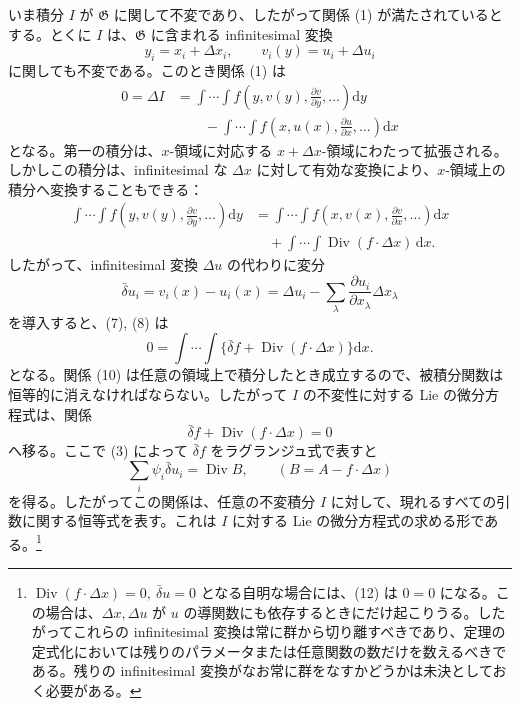 \documentclass[11pt]{article}
\newcommand{\D}{\Delta}
\providecommand{\dd}{\mathrm d}
\providecommand{\Div}{\operatorname{Div}}
\providecommand{\G}{\mathfrak G}
\providecommand{\bd}{\bar{\delta}}
\providecommand{\p}{\partial}
\begin{document}
いま積分 \(I\) が \(\G\) に関して不変であり、したがって関係 (1) が満たされているとする。とくに \(I\) は、\(\G\) に含まれる infinitesimal 変換
\[
y_i=x_i+\D x_i,\qquad v_i(y)=u_i+\D u_i
\]
に関しても不変である。このとき関係 (1) は
\begin{equation}
\begin{aligned}
0=\D I
&=\int\!\cdots\!\int f\!\left(y,v(y),\frac{\p v}{\p y},\ldots\right)\dd y\\
&\qquad-\int\!\cdots\!\int f\!\left(x,u(x),\frac{\p u}{\p x},\ldots\right)\dd x
\end{aligned}
\tag{7}
\end{equation}
となる。第一の積分は、\(x\)-領域に対応する \(x+\D x\)-領域にわたって拡張される。しかしこの積分は、infinitesimal な \(\D x\) に対して有効な変換により、\(x\)-領域上の積分へ変換することもできる：
\begin{equation}
\begin{aligned}
\int\!\cdots\!\int f\!\left(y,v(y),\frac{\p v}{\p y},\ldots\right)\dd y
&=\int\!\cdots\!\int f\!\left(x,v(x),\frac{\p v}{\p x},\ldots\right)\dd x\\
&\quad+\int\!\cdots\!\int \Div(f\cdot \D x)\,\dd x.
\end{aligned}
\tag{8}
\end{equation}
したがって、infinitesimal 変換 \(\D u\) の代わりに変分
\begin{equation}
\bd u_i=v_i(x)-u_i(x)=\D u_i-\sum_\lambda\frac{\p u_i}{\p x_\lambda}\D x_\lambda
\tag{9}
\end{equation}
を導入すると、(7), (8) は
\begin{equation}
0=\int\!\cdots\!\int\{\bd f+\Div(f\cdot\D x)\}\dd x.
\tag{10}
\end{equation}
となる。関係 (10) は任意の領域上で積分したとき成立するので、被積分関数は恒等的に消えなければならない。したがって \(I\) の不変性に対する Lie の微分方程式は、関係
\begin{equation}
\bd f+\Div(f\cdot\D x)=0
\tag{11}
\end{equation}
へ移る。ここで (3) によって \(\bd f\) をラグランジュ式で表すと
\begin{equation}
\sum_i\psi_i\bd u_i=\Div B,\qquad (B=A-f\cdot\D x)
\tag{12}
\end{equation}
を得る。したがってこの関係は、任意の不変積分 \(I\) に対して、現れるすべての引数に関する恒等式を表す。これは \(I\) に対する Lie の微分方程式の求める形である。\footnote{\(\Div(f\cdot\D x)=0,\ \bd u=0\) となる自明な場合には、(12) は \(0=0\) になる。この場合は、\(\D x,\D u\) が \(u\) の導関数にも依存するときにだけ起こりうる。したがってこれらの infinitesimal 変換は常に群から切り離すべきであり、定理の定式化においては残りのパラメータまたは任意関数の数だけを数えるべきである。残りの infinitesimal 変換がなお常に群をなすかどうかは未決としておく必要がある。}
\end{document}
